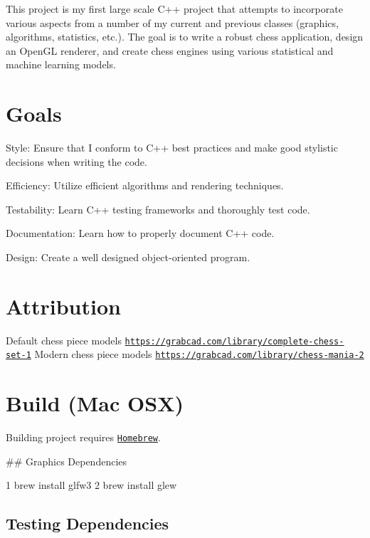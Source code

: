 This project is my first large scale C++ project that attempts to incorporate various aspects from a number of my current and previous classes (graphics, algorithms, statistics, etc.). The goal is to write a robust chess application, design an Open\+GL renderer, and create chess engines using various statistical and machine learning models.

\section*{Goals}


\begin{DoxyItemize}
\item Style\+: Ensure that I conform to C++ best practices and make good stylistic decisions when writing the code.
\item Efficiency\+: Utilize efficient algorithms and rendering techniques.
\item Testability\+: Learn C++ testing frameworks and thoroughly test code.
\item Documentation\+: Learn how to properly document C++ code.
\item Design\+: Create a well designed object-\/oriented program.
\end{DoxyItemize}

\section*{Attribution}

Default chess piece models \href{https://grabcad.com/library/complete-chess-set-1}{\tt https\+://grabcad.\+com/library/complete-\/chess-\/set-\/1} Modern chess piece models \href{https://grabcad.com/library/chess-mania-2}{\tt https\+://grabcad.\+com/library/chess-\/mania-\/2}

\section*{Build (Mac O\+SX)}

Building project requires \href{http://brew.sh/}{\tt Homebrew}.

\#\# Graphics Dependencies 
\begin{DoxyCode}
1 brew install glfw3
2 brew install glew
\end{DoxyCode}


\subsection*{Testing Dependencies}

